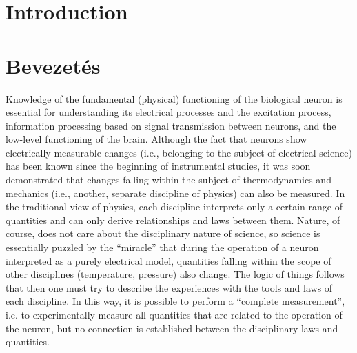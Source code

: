 
\ifx\magyar\undefined
\section{Introduction\label{sec:Physics-Introduction}}
\else
\section{Bevezetés\label{sec:Physics-Introduction}}
\fi



\ifx\magyar\undefined
 Knowledge of the fundamental (physical) functioning of the biological neuron is essential for understanding its electrical processes and the excitation process, information processing based on signal transmission between neurons, and the low-level functioning of the brain. Although the fact that neurons show electrically measurable changes (i.e., belonging to the subject of electrical science) has been known since the beginning of instrumental studies, it was soon demonstrated that changes falling within the subject of thermodynamics and mechanics (i.e., another, separate discipline of physics) can also be measured. In the traditional view of physics, each discipline interprets only a certain range of quantities and can only derive relationships and laws between them. Nature, of course, does not care about the disciplinary nature of science, so science is essentially puzzled by the “miracle” that during the operation of a neuron interpreted as a purely electrical model, quantities falling within the scope of other disciplines (temperature, pressure) also change. The logic of things follows that then one must try to describe the experiences with the tools and laws of each discipline. In this way, it is possible to perform a “complete measurement”,
i.e. to experimentally measure all quantities that are related to the operation of the neuron, but no connection is established between the disciplinary laws and quantities.

\else


